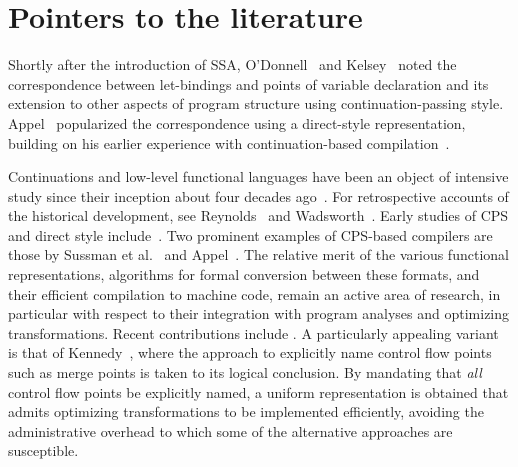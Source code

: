 {%



\section{Pointers to the literature}
\label{section:Part1:Semantics:Literature}



Shortly after the introduction of SSA, O'Donnell~\cite{ODonnellPhD}
and Kelsey~\cite{Kelsey95} noted the correspondence between
let-bindings and points of variable declaration and its extension to
other aspects of program structure using
continuation-passing style. Appel~\cite{Appel98:SSA,Appel:MCIML} popularized
the correspondence using a direct-style representation, building on
his earlier experience with continuation-based
compilation~\cite{Appel:CWC}. 

Continuations and low-level functional languages have been an object
of intensive study since their inception about four decades
ago~\cite{vanWijngaarden1966,Landin1965}.  For retrospective accounts
of the historical development, see Reynolds~\cite{Reynolds:LSC1993}
and Wadsworth~\cite{Wadsworth00}. Early studies of CPS and direct
style include~\cite{Reynolds:1972,Reynolds1974,Plotkin75}.  Two
prominent examples of CPS-based compilers are those by Sussman et
al.~\cite{DBLP:journals/lisp/SussmanS98a} and Appel~\cite{Appel:CWC}.
The relative merit of the various functional representations,
algorithms for formal conversion between these formats, and their
efficient compilation to machine code, remain an active area of
research, in particular with respect to their integration with program
analyses and optimizing transformations.  Recent contributions include
\cite{DBLP:journals/jfp/DanvyMN07,DBLP:journals/lisp/Reppy02,DBLP:conf/icfp/Kennedy07}. 
A particularly appealing variant is that of
Kennedy~\cite{DBLP:conf/icfp/Kennedy07}, where the approach to
explicitly name control flow points such as merge points is taken to
its logical conclusion. By mandating that \emph{all} control flow
points be explicitly named, a uniform representation is obtained that
admits optimizing transformations to be implemented efficiently,
avoiding the administrative overhead to which some of the alternative
approaches are susceptible.

}
